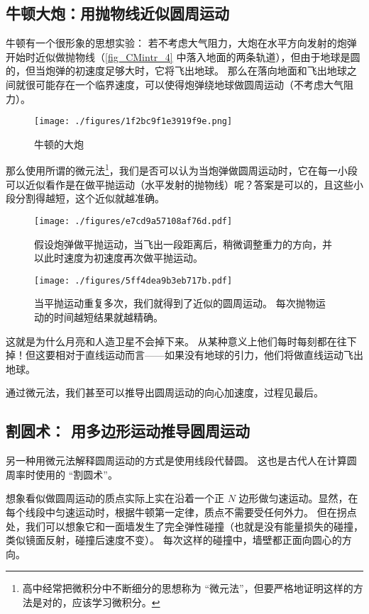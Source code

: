 
\subsection{牛顿大炮：用抛物线近似圆周运动}
牛顿有一个很形象的思想实验： 若不考虑大气阻力，大炮在水平方向发射的炮弹开始时近似做抛物线（\autoref{fig_CMintr_4} 中落入地面的两条轨道），但由于地球是圆的，但当炮弹的初速度足够大时，它将飞出地球。 那么在落向地面和飞出地球之间就很可能存在一个临界速度，可以使得炮弹绕地球做圆周运动（不考虑大气阻力）。

\begin{figure}[ht]
\centering
\texttt{[image: ./figures/1f2bc9f1e3919f9e.png]}
\caption{牛顿的大炮} \label{fig_CMintr_4}
\end{figure}

那么使用所谓的微元法\footnote{高中经常把微积分中不断细分的思想称为 “微元法”，但要严格地证明这样的方法是对的，应该学习微积分。}，我们是否可以认为当炮弹做圆周运动时，它在每一小段可以近似看作是在做平抛运动（水平发射的抛物线）呢？答案是可以的，且这些小段分割得越短，这个近似就越准确。


\begin{figure}[ht]
\centering
\texttt{[image: ./figures/e7cd9a57108af76d.pdf]}
\caption{假设炮弹做平抛运动，当飞出一段距离后，稍微调整重力的方向，并以此时速度为初速度再次做平抛运动。} \label{fig_CMintr_1}
\end{figure}

\begin{figure}[ht]
\centering
\texttt{[image: ./figures/5ff4dea9b3eb717b.pdf]}
\caption{当平抛运动重复多次，我们就得到了近似的圆周运动。 每次抛物运动的时间越短结果就越精确。} \label{fig_CMintr_2}
\end{figure}

这就是为什么月亮和人造卫星不会掉下来。 从某种意义上他们每时每刻都在往下掉！但这要相对于直线运动而言——如果没有地球的引力，他们将做直线运动飞出地球。

通过微元法，我们甚至可以推导出圆周运动的向心加速度，过程见最后。

\subsection{割圆术： 用多边形运动推导圆周运动}
另一种用微元法解释圆周运动的方式是使用线段代替圆。 这也是古代人在计算圆周率时使用的 “割圆术”。

想象看似做圆周运动的质点实际上实在沿着一个正 $N$ 边形做匀速运动。显然，在每个线段中匀速运动时，根据牛顿第一定律，质点不需要受任何外力。 但在拐点处，我们可以想象它和一面墙发生了完全弹性碰撞（也就是没有能量损失的碰撞，类似镜面反射，碰撞后速度不变）。 每次这样的碰撞中，墙壁都正面向圆心的方向。

